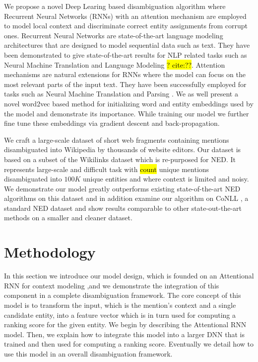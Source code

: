 \documentclass[11pt]{article}
\begin{document}
	We propose a novel Deep Learing based disambiguation algorithm where Recurrent Neural Networks (RNNs) with an attention mechanism are employed to model local context and discriminate correct entity assignments from corrupt ones. Recurrent Neural Networks are state-of-the-art language modeling architectures that are designed to model sequential data such as text. They have been demonstrated to give state-of-the-art results for NLP related tasks such as Neural Machine Translation \cite{bahdanau2014neural} and Language Modeling \hl{? cite:??}. Attention mechanisms are natural extensions for RNNs where the model can focus on the most relevant parts of the input text. They have been successfully employed for tasks such as Neural Machine Translation \cite{bahdanau2014neural} and Parsing \cite{vinyals2015grammar}. 
	We as well present a novel word2vec based method for initializing word and entity embeddings used by the model and demonstrate its importance. While training our model we further fine tune these embeddings via gradient descent and back-propagation.
		
	We craft a large-scale dataset of short web fragments containing mentions disambiguated into Wikipedia by thousands of website editors. Our dataset is based on a subset of the Wikilinks dataset \cite{singh12:wiki-links} which is re-purposed for NED. It represents large-scale and difficult task with \hl{count} unique mentions disambiguated into $100K$ unique entities and where context is limited and noisy. We demonstrate our model greatly outperforms existing state-of-the-art NED algorithms on this dataset and in addition examine our algorithm on CoNLL \cite{hoffart2011robust}, a standard NED dataset and show results comparable to other state-out-the-art methods on a smaller and cleaner dataset.
	
	\section{Methodology}
	
	In this section we introduce our model design, which is founded on an Attentional RNN for context modeling ,and we demonstrate the integration of this component in a complete disambiguation framework. The core concept of this model is to transform the input, which is the mention's context and a single candidate entity, into a feature vector which is in turn used for computing a ranking score for the given entity. We begin by describing the Attentional RNN model. Then, we explain how to integrate this model into a larger DNN that is trained and then used for computing a ranking score. Eventually we detail how to use this model in an overall disambiguation framework.
	
\end{document}
